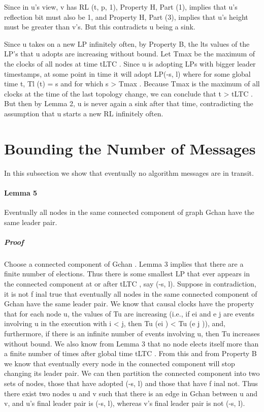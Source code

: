 Since in u’s view, v has RL (t, p, 1), Property H, Part (1), implies that u’s reflection bit must also be 1, and Property H, Part (3), implies that u’s height must be greater than v’s. But this contradicts u being a sink.

Since u takes on a new LP infinitely often, by Property B, the lts values of the LP’s that u adopts are increasing without bound. Let Tmax be the maximum of the clocks of all nodes at time tLTC . Since u is adopting LPs with bigger leader timestamps, at some point in time it will adopt LP(-s, l) where for some global time t, Tl (t) = s and for which s > Tmax . Because Tmax is the maximum of all clocks at the time of the last topology change, we can conclude that t > tLTC . But then by Lemma 2, u is never again a sink after that time, contradicting the assumption that u starts a new RL infinitely often.
\section{Bounding the Number of Messages}
In this subsection we show that eventually no algorithm messages are in transit.
\paragraph{Lemma 5} Eventually all nodes in the same connected component of graph Gchan have the same leader pair.
\subparagraph{Proof}Choose a connected component of Gchan . Lemma 3 implies that there are a finite number of elections. Thus there is some smallest LP that ever appears in the connected component at or after tLTC , say (-s, l). Suppose in contradiction, it is not f inal true that eventually all nodes in the same connected component of Gchan have the same leader pair. We know that causal clocks have the property that for each node u, the values of Tu are increasing (i.e., if ei and e j are events involving u in the execution with i < j, then Tu (ei ) < Tu (e j )), and, furthermore, if there is an infinite number of events involving u, then Tu increases without bound. We also know from Lemma 3 that no node elects itself more than a finite number of times after global time tLTC . From this and from Property B we know that eventually every node in the connected component will stop changing its leader pair. We can then partition the connected component into two sets of nodes, those that have adopted (-s, l) and those that have f inal not. Thus there exist two nodes u and v such that there is an edge in Gchan between u and v, and u’s final leader pair is (-s, l), whereas v’s final leader pair is not (-s, l).

